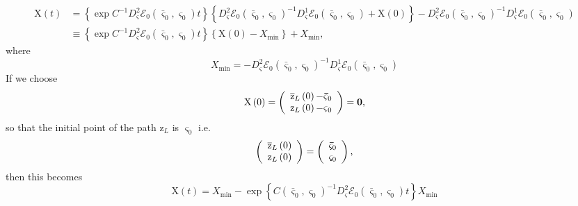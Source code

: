 \documentclass[aps,preprint]{revtex4}%
\begin{document}
\begin{align}
\mathrm{X}\left(  t\right)   &  =\left\{  \exp C^{-1}D_{\mathbf{\varsigma}%
}^{2}\mathcal{E}_{0}\left(  \mathbf{\bar{\varsigma}}_{0},\mathbf{\varsigma
}_{0}\right)  t\right\}  \left\{  D_{\mathbf{\varsigma}}^{2}\mathcal{E}%
_{0}\left(  \mathbf{\bar{\varsigma}}_{0},\mathbf{\varsigma}_{0}\right)
^{-1}D_{\mathbf{\varsigma}}^{1}\mathcal{E}_{0}\left(  \mathbf{\bar{\varsigma}%
}_{0},\mathbf{\varsigma}_{0}\right)  +\mathrm{X}\left(  0\right)  \right\}
-D_{\mathbf{\varsigma}}^{2}\mathcal{E}_{0}\left(  \mathbf{\bar{\varsigma}}%
_{0},\mathbf{\varsigma}_{0}\right)  ^{-1}D_{\mathbf{\varsigma}}^{1}%
\mathcal{E}_{0}\left(  \mathbf{\bar{\varsigma}}_{0},\mathbf{\varsigma}%
_{0}\right) \nonumber\\
&  \equiv\left\{  \exp C^{-1}D_{\mathbf{\varsigma}}^{2}\mathcal{E}_{0}\left(
\mathbf{\bar{\varsigma}}_{0},\mathbf{\varsigma}_{0}\right)  t\right\}
\left\{  \mathrm{X}\left(  0\right)  -X_{\min}\right\}  +X_{\min},
\end{align}
where
\begin{equation}
X_{\min}=-D_{\mathbf{\varsigma}}^{2}\mathcal{E}_{0}\left(  \mathbf{\bar
{\varsigma}}_{0},\mathbf{\varsigma}_{0}\right)  ^{-1}D_{\mathbf{\varsigma}%
}^{1}\mathcal{E}_{0}\left(  \mathbf{\bar{\varsigma}}_{0},\mathbf{\varsigma
}_{0}\right)
\end{equation}
If we choose
\begin{equation}
\mathrm{X}\left(  0\right)  =\left(
\begin{array}
[c]{c}%
\overline{\mathrm{z}}_{L}\left(  0\right)  \mathbf{-\bar{\varsigma}}_{0}\\
\mathrm{z}_{L}\left(  0\right)  \mathbf{-\varsigma}_{0}%
\end{array}
\right)  =\mathbf{0,}%
\end{equation}
so that the initial point of the path $\mathrm{z}_{L}$ is $\mathbf{\varsigma
}_{0}$ i.e.
\begin{equation}
\left(
\begin{array}
[c]{c}%
\overline{\mathrm{z}}_{L}\left(  0\right) \\
\mathrm{z}_{L}\left(  0\right)
\end{array}
\right)  =\left(
\begin{array}
[c]{c}%
\mathbf{\bar{\varsigma}}_{0}\\
\mathbf{\varsigma}_{0}%
\end{array}
\right)  ,
\end{equation}
then this becomes
\begin{equation}
\mathrm{X}\left(  t\right)  =X_{\min}-\exp\left\{  C\left(  \mathbf{\bar
{\varsigma}}_{0},\mathbf{\varsigma}_{0}\right)  ^{-1}D_{\mathbf{\varsigma}%
}^{2}\mathcal{E}_{0}\left(  \mathbf{\bar{\varsigma}}_{0},\mathbf{\varsigma
}_{0}\right)  t\right\}  X_{\min}%
\end{equation}
\end{document}
